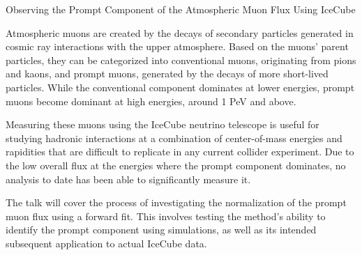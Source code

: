 Observing the Prompt Component of the Atmospheric Muon Flux Using IceCube

Atmospheric muons are created by the decays of secondary particles generated in cosmic ray interactions with the upper atmosphere. Based on the muons' parent particles, they can be categorized into conventional muons, originating from pions and kaons, and prompt muons, generated by the decays of more short-lived particles. While the conventional component dominates at lower energies, prompt muons become dominant at high energies, around 1 PeV and above.

Measuring these muons using the IceCube neutrino telescope is useful for studying hadronic interactions at a combination of center-of-mass energies and rapidities that are difficult to replicate in any current collider experiment. Due to the low overall flux at the energies where the prompt component dominates, no analysis to date has been able to significantly measure it.

The talk will cover the process of investigating the normalization of the prompt muon flux using a forward fit. This involves testing the method’s ability to identify the prompt component using simulations, as well as its intended subsequent application to actual IceCube data.